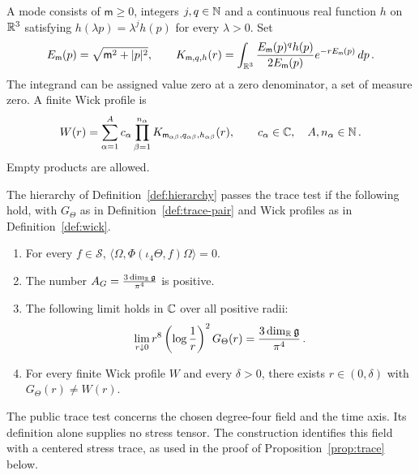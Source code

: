 \begin{definition}\label{def:wick}
A mode consists of $\mathsf m\ge0$, integers $j,q\in\mathbb N$ and a continuous real function $h$ on $\mathbb R^3$ satisfying $h(\lambda p)=\lambda^jh(p)$ for every $\lambda>0$.
Set
\begin{equation}\label{eq:mode}
E_{\mathsf m}(p)=\sqrt{\mathsf m^2+|p|^2},
\qquad K_{\mathsf m,q,h}(r)=\int_{\mathbb R^3}\frac{E_{\mathsf m}(p)^qh(p)}{2E_{\mathsf m}(p)}e^{-rE_{\mathsf m}(p)}\,dp\,.
\end{equation}
The integrand can be assigned value zero at a zero denominator, a set of measure zero.
A finite Wick profile is
\begin{equation}\label{eq:wick}
W(r)=\sum_{\alpha=1}^A c_\alpha\prod_{\beta=1}^{n_\alpha}
 K_{\mathsf m_{\alpha\beta},q_{\alpha\beta},h_{\alpha\beta}}(r),
\qquad c_\alpha\in\mathbb C,\quad A,n_\alpha\in\mathbb N\,.
\end{equation}
Empty products are allowed.
\end{definition}

\begin{definition}\label{def:trace}
The hierarchy of Definition~\ref{def:hierarchy} passes the trace test if the following hold, with $G_\Theta$ as in Definition~\ref{def:trace-pair} and Wick profiles as in Definition~\ref{def:wick}.
\begin{enumerate}[label=\textup{T\arabic*.},ref=T\arabic*]
\item\label{trace:1} For every $f\in\mathcal S$, $\langle\Omega,\Phi(\iota_4\Theta,f)\Omega\rangle=0$.
\item\label{trace:2} The number $A_G=\frac{3\dim_\mathbb R\mathfrak g}{\pi^4}$ is positive.
\item\label{trace:3} The following limit holds in $\mathbb C$ over all positive radii:
\begin{equation}\label{eq:trace-law}
\lim_{r\downarrow0}r^8\left(\log\frac{1}{r}\right)^2G_\Theta(r)=\frac{3\dim_\mathbb R\mathfrak g}{\pi^4}\,.
\end{equation}
\item\label{trace:4} For every finite Wick profile $W$ and every $\delta>0$, there exists $r\in(0,\delta)$ with $G_\Theta(r)\ne W(r)$.
\end{enumerate}
\end{definition}

The public trace test concerns the chosen degree-four field and the time axis.
Its definition alone supplies no stress tensor.
The construction identifies this field with a centered stress trace, as used in the proof of Proposition~\ref{prop:trace} below.

